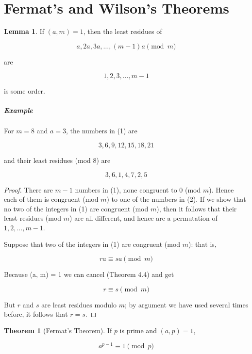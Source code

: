 \documentclass{article}
\theoremstyle{definition} %
\newtheorem{theorem}{Theorem}[section] %
\theoremstyle{definition}
\theoremstyle{definition}
\newtheorem{lemma}{Lemma}[section]
\theoremstyle{definition}
\begin{document}
  \section{Fermat's and Wilson's Theorems}
  
  \begin{lemma}
    If $(a, m) = 1$, then the least residues of
    
    \begin{equation}
      a, 2a, 3a, \dots, (m - 1)a \pmod{m}
    \end{equation}
    
    are
    
    \begin{equation}
      1, 2, 3, \dots, m - 1
    \end{equation}
    
    is some order.
  \end{lemma}
  
  \subparagraph{Example} For $m = 8$ and $a = 3$, the numbers in (1) are
  
  \[ 3, 6, 9, 12, 15, 18, 21 \]
  
  and their least residues (mod 8) are
  
  \[ 3, 6, 1, 4, 7, 2, 5 \]
  
  \begin{proof}
    There are $m - 1$ numbers in (1), none congruent to 0 (mod $m$). Hence
    each of them is congruent (mod $m$) to one of the numbers in (2).
    If we show that no two of the integers in (1) are congruent (mod $m$), then
    it follows that their least residues (mod $m$) are all different, and hence are
    a permutation of $1, 2, \dots, m - 1$.
    
    Suppose that two of the integers in (1) are congruent (mod $m$): that is,
    
    \[ ra \equiv sa \pmod{m} \]
    
    Because (a, m) = 1 we can cancel (Theorem 4.4) and get
    
    \[ r \equiv s \pmod{m} \]
    
    But $r$ and $s$ are least residues modulo $m$; by argument we have used
    several times before, it follows that $r = s$.
  \end{proof}
  
  \begin{theorem}[Fermat's Theorem]
    If $p$ is prime and $(a, p) = 1$,
    
    \[ a^{p - 1} \equiv 1 \pmod{p} \]
  \end{theorem}
  
\end{document}
